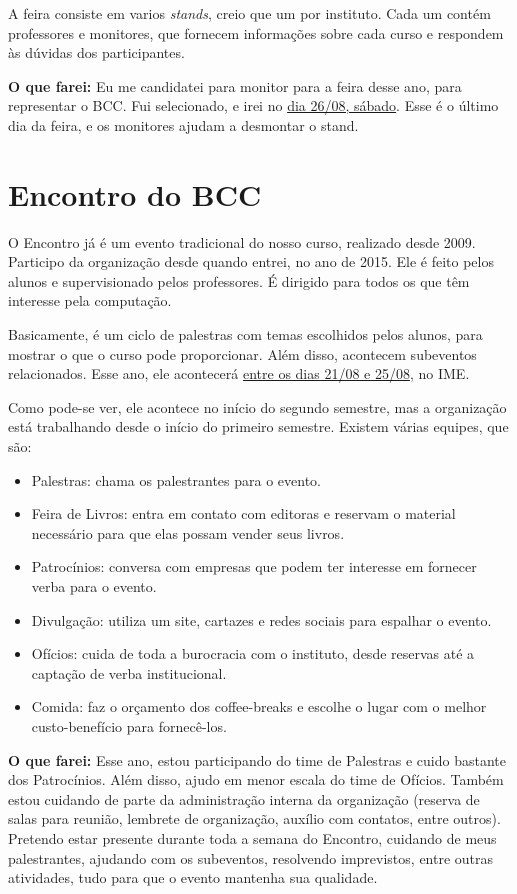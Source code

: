\documentclass[12pt,letterpaper]{article}
\begin{document}
	A feira consiste em varios \textit{stands}, creio que um por instituto. Cada um contém professores e monitores, que fornecem informações sobre cada curso e respondem às dúvidas dos participantes.
	
	\textbf{O que farei:} Eu me candidatei para monitor para a feira desse ano, para representar o BCC. Fui selecionado, e irei no \underline{dia 26/08, sábado}. Esse é o último dia da feira, e os monitores ajudam a desmontar o stand.
	
	\section{Encontro do BCC}
	
	O Encontro já é um evento tradicional do nosso curso, realizado desde 2009. Participo da organização desde quando entrei, no ano de 2015.	Ele é feito pelos alunos e supervisionado pelos professores. É dirigido para todos os que têm interesse pela computação.
	
	Basicamente, é um ciclo de palestras com temas escolhidos pelos alunos, para mostrar o que o curso pode proporcionar. Além disso, acontecem subeventos relacionados. Esse ano, ele acontecerá \underline{entre os dias 21/08 e 25/08}, no IME. 
	
	Como pode-se ver, ele acontece no início do segundo semestre, mas a organização está trabalhando desde o início do primeiro semestre. Existem várias equipes, que são:
	
	\begin{itemize}
		\item Palestras: chama os palestrantes para o evento.
		\item Feira de Livros: entra em contato com editoras e reservam o material necessário para que elas possam vender seus livros.
		\item Patrocínios: conversa com empresas que podem ter interesse em fornecer verba para o evento.
		\item Divulgação: utiliza um site, cartazes e redes sociais para espalhar o evento.
		\item Ofícios: cuida de toda a burocracia com o instituto, desde reservas até a captação de verba institucional.
		\item Comida: faz o orçamento dos coffee-breaks e escolhe o lugar com o melhor custo-benefício para fornecê-los.
	\end{itemize}
	
	\textbf{O que farei:} Esse ano, estou participando do time de Palestras e cuido bastante dos Patrocínios. Além disso, ajudo em menor escala do time de Ofícios. Também estou cuidando de parte da administração interna da organização (reserva de salas para reunião, lembrete de organização, auxílio com contatos, entre outros). Pretendo estar presente durante toda a semana do Encontro, cuidando de meus palestrantes, ajudando com os subeventos, resolvendo imprevistos, entre outras atividades, tudo para que o evento mantenha sua qualidade.
	
\end{document}
